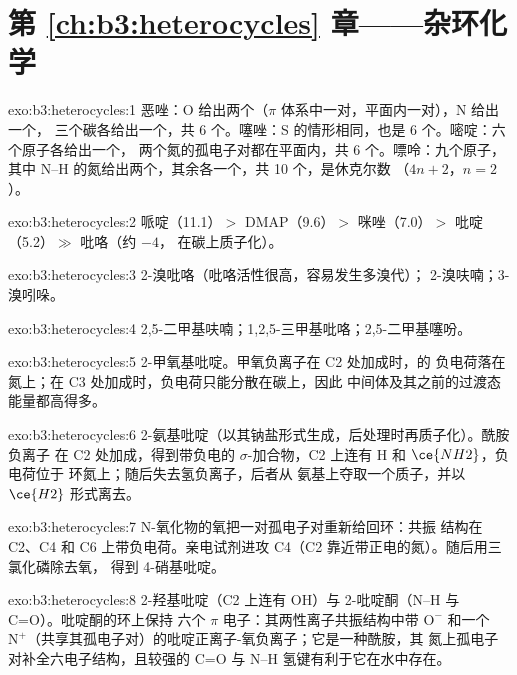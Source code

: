\section*{第 \ref{ch:b3:heterocycles} 章——杂环化学}

\begin{solution}{exo:b3:heterocycles:1}
恶唑：O 给出两个（$\pi$ 体系中一对，平面内一对），N 给出一个，
三个碳各给出一个，共 6 个。噻唑：S 的情形相同，也是 6 个。嘧啶：六个原子各给出一个，
两个氮的孤电子对都在平面内，共 6 个。嘌呤：九个原子，
其中 N--H 的氮给出两个，其余各一个，共 10 个，是休克尔数
（$4n + 2$，$n = 2$）。
\end{solution}

\begin{solution}{exo:b3:heterocycles:2}
哌啶（11.1）$>$ DMAP（9.6）$>$ 咪唑（7.0）$>$ 吡啶（5.2）$\gg$ 吡咯（约 $-4$，
在碳上质子化）。
\end{solution}

\begin{solution}{exo:b3:heterocycles:3}
2-溴吡咯（吡咯活性很高，容易发生多溴代）；
2-溴呋喃；3-溴吲哚。
\end{solution}

\begin{solution}{exo:b3:heterocycles:4}
2,5-二甲基呋喃；1,2,5-三甲基吡咯；2,5-二甲基噻吩。
\end{solution}

\begin{solution}{exo:b3:heterocycles:5}
2-甲氧基吡啶。甲氧负离子在 C2 处加成时，的
负电荷落在氮上；在 C3 处加成时，负电荷只能分散在碳上，因此
中间体及其之前的过渡态能量都高得多。
\end{solution}

\begin{solution}{exo:b3:heterocycles:6}
2-氨基吡啶（以其钠盐形式生成，后处理时再质子化）。酰胺负离子
在 C2 处加成，得到带负电的 $\sigma$-加合物，C2 上连有 H 和 $\ce{NH2}$，负电荷位于
环氮上；随后失去氢负离子，后者从
氨基上夺取一个质子，并以 $\ce{H2}$ 形式离去。
\end{solution}

\begin{solution}{exo:b3:heterocycles:7}
N-氧化物的氧把一对孤电子对重新给回环：共振
结构在 C2、C4 和 C6 上带负电荷。亲电试剂进攻 C4（C2
靠近带正电的氮）。随后用三氯化磷除去氧，
得到 4-硝基吡啶。
\end{solution}

\begin{solution}{exo:b3:heterocycles:8}
2-羟基吡啶（C2 上连有 OH）与 2-吡啶酮（N--H 与 C=O）。吡啶酮的环上保持
六个 $\pi$ 电子：其两性离子共振结构中带 $\mathrm{O^-}$ 和一个
$\mathrm{N^+}$（共享其孤电子对）的吡啶正离子-氧负离子；它是一种酰胺，其
氮上孤电子对补全六电子结构，且较强的 C=O 与 N--H
氢键有利于它在水中存在。
\end{solution}

